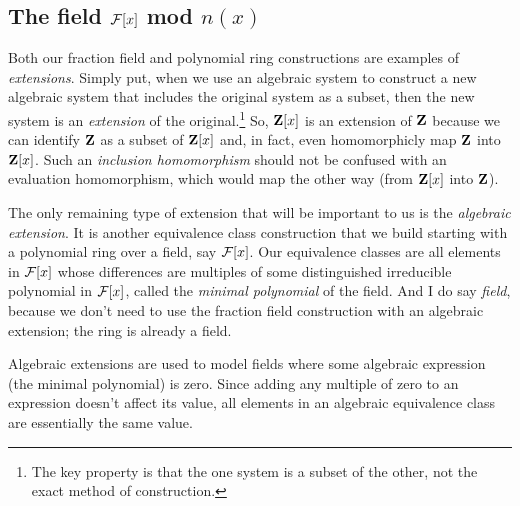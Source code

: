 \begin{comment}

\mysection{Linear Algebra}
\qquad [van der Waerden], Ch. 4, \S6.11 (trace of an field extension)

Determinants; trace.

\end{comment}

\subsection*{\qquad The field ${\cal F}[x]$ mod $n(x)$}

Both our fraction field and polynomial ring constructions are examples
of {\it extensions}.  Simply put, when we use an algebraic system to
construct a new algebraic system that includes the original system as
a subset, then the new system is an {\it extension} of the
original.\footnote{The key property is that the one system is a subset
of the other, not the exact method of construction.}  So, ${\bf Z}[x]$
is an extension of ${\bf Z}$ because we can identify ${\bf Z}$ as a
subset of ${\bf Z}[x]$ and, in fact, even homomorphicly map ${\bf Z}$
into ${\bf Z}[x]$.  Such an {\it inclusion homomorphism} should not be
confused with an evaluation homomorphism, which would map the other
way (from ${\bf Z}[x]$ into ${\bf Z}$).

The only remaining type of extension that will be important to us is
the {\it algebraic extension}.  It is another equivalence class
construction that we build starting with a polynomial ring over a
field, say ${\cal F}[x]$.  Our equivalence classes are all elements in
${\cal F}[x]$ whose differences are multiples of some distinguished
irreducible polynomial in ${\cal F}[x]$, called the {\it minimal
polynomial} of the field.  And I do say {\it field}, because we don't
need to use the fraction field construction with an algebraic
extension; the ring is already a field.

Algebraic extensions are used to model fields where some algebraic
expression (the minimal polynomial) is zero.  Since adding any
multiple of zero to an expression doesn't affect its value, all
elements in an algebraic equivalence class are essentially the same
value.

